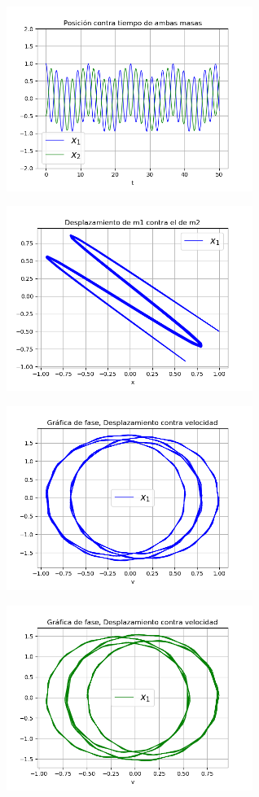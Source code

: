 \documentclass[a4paper]{article}
\begin{document}
\begin{center}
\includegraphics[height=6cm]{ejemplo3-1.png}

\includegraphics[height=6cm]{recta3-1.png}

\includegraphics[height=6cm]{circulo3-1-1.png}

\includegraphics[height=6cm]{circulo3-1-2.png}
\end{center}
\end{document}
